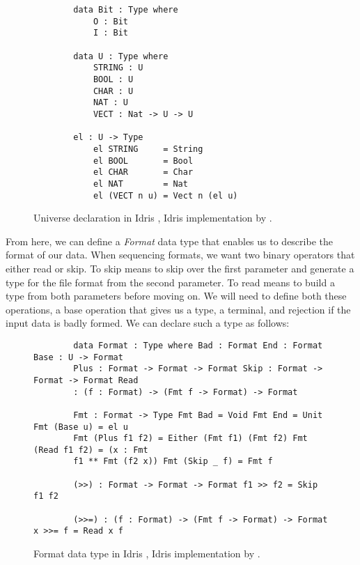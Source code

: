 \begin{figure}[h]
    \caption{Universe declaration in Idris \cite{power_of_pi}, Idris
    implementation by \cite{idris_pop}.}
    \label{universe}
    \begin{lstlisting}
        data Bit : Type where 
            O : Bit 
            I : Bit

        data U : Type where
            STRING : U
            BOOL : U
            CHAR : U
            NAT : U
            VECT : Nat -> U -> U
        
        el : U -> Type
            el STRING     = String
            el BOOL       = Bool
            el CHAR       = Char
            el NAT        = Nat
            el (VECT n u) = Vect n (el u)
    \end{lstlisting}
\end{figure}

From here, we can define a \textit{Format} data type that enables us to describe
the format of our data. When sequencing formats, we want two binary operators
that either read or skip. To skip means to skip over the first parameter and
generate a type for the file format from the second parameter. To read means to
build a type from both parameters before moving on. We will need to define both
these operations, a base operation that gives us a type, a terminal, and
rejection if the input data is badly formed. We can declare such a type as
follows: 

\begin{figure}[h]
    \caption{Format data type in Idris \cite{power_of_pi}, Idris implementation
    by \cite{idris_pop}.}
    \label{formatDeclaration}
    \begin{lstlisting}
        data Format : Type where Bad : Format End : Format Base : U -> Format
        Plus : Format -> Format -> Format Skip : Format -> Format -> Format Read
        : (f : Format) -> (Fmt f -> Format) -> Format

        Fmt : Format -> Type Fmt Bad = Void Fmt End = Unit Fmt (Base u) = el u
        Fmt (Plus f1 f2) = Either (Fmt f1) (Fmt f2) Fmt (Read f1 f2) = (x : Fmt
        f1 ** Fmt (f2 x)) Fmt (Skip _ f) = Fmt f

        (>>) : Format -> Format -> Format f1 >> f2 = Skip f1 f2

        (>>=) : (f : Format) -> (Fmt f -> Format) -> Format x >>= f = Read x f
    \end{lstlisting}
\end{figure}

